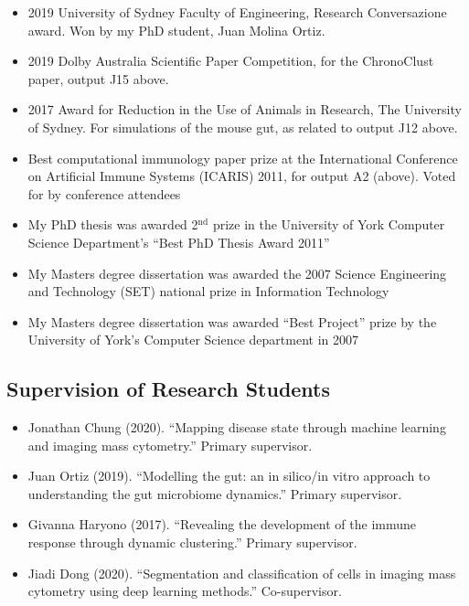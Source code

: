 \documentclass[a4paper]{article}
\begin{document}
\begin{itemize}
 \item 2019 University of Sydney Faculty of Engineering, Research Conversazione award. Won by my PhD student, Juan Molina Ortiz.
 \item 2019 Dolby Australia Scientific Paper Competition, for the ChronoClust paper, output J15 above.
 \item 2017 Award for Reduction in the Use of Animals in Research, The University of Sydney. For simulations of the mouse gut, as related to output J12 above.
 \item Best computational immunology paper prize at the International Conference on Artificial Immune Systems (ICARIS) 2011, for output A2 (above). Voted for by conference attendees
 \item My PhD thesis was awarded 2$^{\mathrm{nd}}$ prize in the University of York Computer Science Department's ``Best PhD Thesis Award 2011''
 \item My Masters degree dissertation was awarded the 2007 Science Engineering and Technology (SET) national prize in Information Technology
 \item My Masters degree dissertation was awarded ``Best Project'' prize by the University of York's Computer Science department in 2007
\end{itemize}

\subsection*{Supervision of Research Students}

\begin{itemize}
    \item Jonathan Chung (2020). ``Mapping disease state through machine learning and imaging mass cytometry.'' Primary supervisor.

    \item Juan Ortiz (2019). ``Modelling the gut: an in silico/in vitro approach to understanding the gut microbiome dynamics.'' Primary supervisor.

    \item Givanna Haryono (2017). ``Revealing the development of the immune response through dynamic clustering.'' Primary supervisor. %
\end{itemize}

\begin{itemize}
\item Jiadi Dong (2020). ``Segmentation and classification of cells in imaging mass cytometry using deep learning methods.'' Co-supervisor.
\end{itemize}
\end{document}
